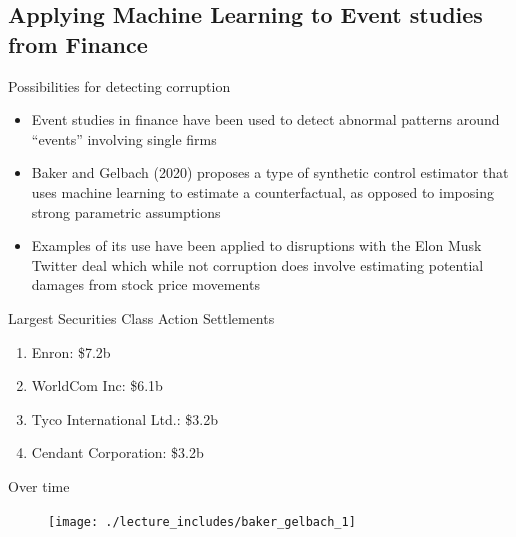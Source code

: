 \documentclass{beamer}
\begin{document}
\subsection{Applying Machine Learning to Event studies from Finance}

\begin{frame}{Possibilities for detecting corruption}

\begin{itemize}

\item Event studies in finance have been used to detect abnormal patterns around ``events'' involving single firms
\item Baker and Gelbach (2020) proposes a type of synthetic control estimator that uses machine learning to estimate a counterfactual, as opposed to imposing strong parametric assumptions
\item Examples of its use have been applied to disruptions with the Elon Musk Twitter deal which while not corruption does involve estimating potential damages from stock price movements

\end{itemize}

\end{frame}

\begin{frame}{Largest Securities Class Action Settlements}

\begin{enumerate}

\item Enron: \$7.2b
\item WorldCom Inc: \$6.1b
\item Tyco International Ltd.: \$3.2b
\item Cendant Corporation: \$3.2b

\end{enumerate}

\end{frame}

\begin{frame}{Over time}

\begin{figure}
\texttt{[image: ./lecture\_includes/baker\_gelbach\_1]}
\end{figure}
\end{frame}
\end{document}
